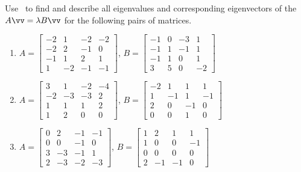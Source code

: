 \begin{exercise}  
Use \script\ to find and describe all eigenvalues and corresponding eigenvectors of the  \(A\vv=\lambda B\vv\) for the following pairs of matrices.
\begin{enumerate}
\item \(A=\begin{bmatrix} -2 & 1 & -2 & -2
\\ -2 & 2 & -1 & 0
\\ -1 & 1 & 2 & 1
\\ 1 & -2 & -1 & -1 \end{bmatrix}\),
\(B=\begin{bmatrix} -1 & 0 & -3 & 1
\\ -1 & 1 & -1 & 1
\\ -1 & 1 & 0 & 1
\\ 3 & 5 & 0 & -2 \end{bmatrix}\)

\item \(A=\begin{bmatrix} 3 & 1 & -2 & -4
\\ -2 & -3 & -3 & 2
\\ 1 & 1 & 1 & 2
\\ 1 & 2 & 0 & 0 \end{bmatrix}\),
\(B=\begin{bmatrix} -2 & 1 & 1 & 1
\\ 1 & -1 & 1 & -1
\\ 2 & 0 & -1 & 0
\\ 0 & 0 & 1 & 0 \end{bmatrix}\)

\item \(A=\begin{bmatrix} 0 & 2 & -1 & -1
\\ 0 & 0 & -1 & 0
\\ 3 & -3 & -1 & 1
\\ 2 & -3 & -2 & -3 \end{bmatrix}\),
\(B=\begin{bmatrix} 1 & 2 & 1 & 1
\\ 1 & 0 & 0 & -1
\\ 0 & 0 & 0 & 0
\\ 2 & -1 & -1 & 0 \end{bmatrix}\)


\end{enumerate}
\end{exercise}

